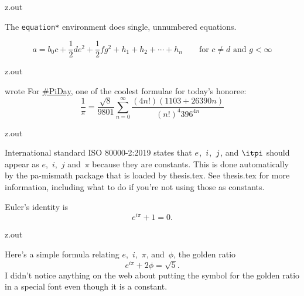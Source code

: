 \begin{VerbatimOut}{z.out}

The \verb+equation*+ environment does single, unnumbered equations.

\begin{equation*}
  a = b_0c + \frac12 de^2 + {\textstyle \frac12} fg^2
    + h_1 + h_2 + \cdots + h_n
    \qquad \text{for \(c \ne d\) and \(g < \infty\)}
\end{equation*}
\end{VerbatimOut}

\MyIO


\begin{VerbatimOut}{z.out}

\textcite{greene-2021-03-14} wrote
  For
  \href{https://twitter.com/hashtag/PiDay?src=hashtag\_click\#PiDay}{\#PiDay},
  one of the coolest formulae for today's honoree:
  \[
    \frac 1\pi
    =
    \frac {\sqrt8} {9801}
    \sum_{n=0}^\infty
    \frac  {(4n!) (1103+26390n)}  {(n!)^4 396^{4n}}
  \]
\end{VerbatimOut}

\MyIO


\begin{VerbatimOut}{z.out}

International standard ISO 80000-2:2019 \cite{iso8000022019}
states that $\mit e$,~$\mit i$,~$\mit j$,
and $\itpi$ should appear as
$e$,~$i$,~$j$
and~$\pi$ because they are constants.
This is done automatically by the pa-mismath package
that is loaded by thesis.tex.
See thesis.tex for more information,
including what to do if you're not using those as constants.

Euler's identity is
\begin{equation*}
  e^{i\pi} + 1 = 0.
\end{equation*}
\end{VerbatimOut}

\MyIO


\begin{VerbatimOut}{z.out}

Here's a simple formula relating $e$,~$i$,~$\pi$, and~$\phi$,
the golden ratio
\begin{equation}
  e^{i\pi} + 2\phi = \sqrt 5.
\end{equation}
I didn't notice anything on the web about putting the symbol for
the golden ratio in a special font even though it is a constant.
\end{VerbatimOut}

